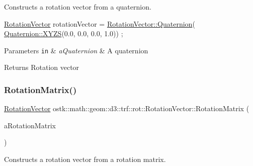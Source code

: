 Constructs a rotation vector from a quaternion. 


\begin{DoxyCode}
\hyperlink{classostk_1_1math_1_1geom_1_1d3_1_1trf_1_1rot_1_1_rotation_vector_ad05e6af649dbdd145793773e2ab1cdce}{RotationVector} rotationVector = \hyperlink{classostk_1_1math_1_1geom_1_1d3_1_1trf_1_1rot_1_1_rotation_vector_a48571eb0d572f0a97caa5aa95a0f1b68}{RotationVector::Quaternion}(
      \hyperlink{classostk_1_1math_1_1geom_1_1d3_1_1trf_1_1rot_1_1_quaternion_ac57ea57a4033622ed1389101b2e58c76}{Quaternion::XYZS}(0.0, 0.0, 0.0, 1.0)) ;
\end{DoxyCode}



\begin{DoxyParams}[1]{Parameters}
\mbox{\tt in}  & {\em a\+Quaternion} & A quaternion \\
\hline
\end{DoxyParams}
\begin{DoxyReturn}{Returns}
Rotation vector 
\end{DoxyReturn}
\mbox{\label{classostk_1_1math_1_1geom_1_1d3_1_1trf_1_1rot_1_1_rotation_vector_a70393e9ab7237fbb7510ce19a17abd0c}} 
\subsubsection{\texorpdfstring{Rotation\+Matrix()}{RotationMatrix()}}
{\footnotesize\ttfamily \hyperlink{classostk_1_1math_1_1geom_1_1d3_1_1trf_1_1rot_1_1_rotation_vector}{Rotation\+Vector} ostk\+::math\+::geom\+::d3\+::trf\+::rot\+::\+Rotation\+Vector\+::\+Rotation\+Matrix (\begin{DoxyParamCaption}\item[{const \hyperlink{classostk_1_1math_1_1geom_1_1d3_1_1trf_1_1rot_1_1_rotation_matrix}{rot\+::\+Rotation\+Matrix} \&}]{a\+Rotation\+Matrix }\end{DoxyParamCaption})\hspace{0.3cm}{\ttfamily [static]}}



Constructs a rotation vector from a rotation matrix. 


